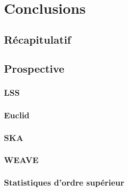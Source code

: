 
\chapter{Conclusions} %

\label{Chapter9} %



\section{Récapitulatif}

\section{Prospective}
\subsection{LSS}
\subsection{Euclid}
\subsection{SKA}
\subsection{WEAVE}
\subsection{Statistiques d'ordre supérieur}


